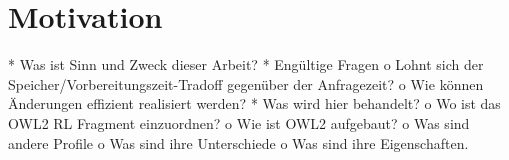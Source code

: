 \chapter{Motivation}
    * Was ist Sinn und Zweck dieser Arbeit?
    * Engültige Fragen
          o Lohnt sich der Speicher/Vorbereitungszeit-Tradoff gegenüber der Anfragezeit?
          o Wie können Änderungen effizient realisiert werden? 
    * Was wird hier behandelt?
          o Wo ist das OWL2 RL Fragment einzuordnen?
          o Wie ist OWL2 aufgebaut?
          o Was sind andere Profile
          o Was sind ihre Unterschiede
          o Was sind ihre Eigenschaften. 
